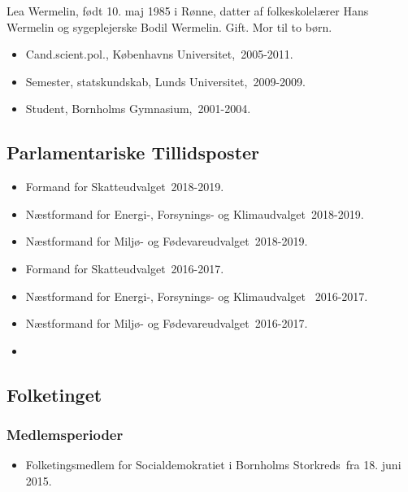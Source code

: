 \documentclass[11pt, a4paper]{awesome-cv}
\begin{document}
\makecvheader[R]
\makelettertitle
\begin{cvletter}
Lea Wermelin, født 10. maj 1985 i Rønne, datter af folkeskolelærer Hans Wermelin og sygeplejerske Bodil Wermelin. Gift. Mor til to børn. 

\begin{itemize}
\item Cand.scient.pol., Københavns Universitet, 2005-2011.
\item Semester, statskundskab, Lunds Universitet, 2009-2009.
\item Student, Bornholms Gymnasium, 2001-2004.
\end{itemize}
\subsection*{Parlamentariske Tillidsposter}
\begin{itemize}
\item Formand for Skatteudvalget 2018-2019.
\item Næstformand for Energi-, Forsynings- og Klimaudvalget 2018-2019.
\item Næstformand for Miljø- og Fødevareudvalget 2018-2019.
\item Formand for Skatteudvalget 2016-2017.
\item Næstformand for Energi-, Forsynings- og Klimaudvalget  2016-2017.
\item Næstformand for Miljø- og Fødevareudvalget 2016-2017.
\item 
\end{itemize}
\subsection*{Folketinget}
\subsubsection*{Medlemsperioder}
\begin{itemize}
\item Folketingsmedlem for Socialdemokratiet i Bornholms Storkreds fra 18. juni 2015.
\end{itemize}

\end{cvletter}
\end{document}
